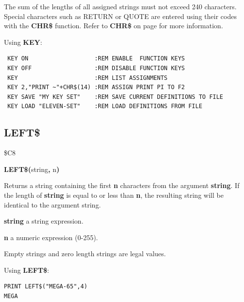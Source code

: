 \begin{description}[leftmargin=2cm,style=nextline]
\item [Remarks:] The sum of the lengths of all assigned strings
                 must not exceed 240 characters.
                 Special characters such as RETURN or QUOTE are entered
                 using their codes with the {\bf CHR\$} function.
                 Refer to {\bf CHR\$} on page \pageref{chrcommand}
                 for more information.

\item [Examples:] Using {\bf KEY}:
\begin{tcolorbox}[colback=black,coltext=white]
\verbatimfont{\codefont}
\begin{verbatim}
 KEY ON                   :REM ENABLE  FUNCTION KEYS
 KEY OFF                  :REM DISABLE FUNCTION KEYS
 KEY                      :REM LIST ASSIGNMENTS
 KEY 2,"PRINT ~"+CHR$(14) :REM ASSIGN PRINT PI TO F2
 KEY SAVE "MY KEY SET"    :REM SAVE CURRENT DEFINITIONS TO FILE
 KEY LOAD "ELEVEN-SET"    :REM LOAD DEFINITIONS FROM FILE
\end{verbatim}
\end{tcolorbox}
\end{description}


\newpage
\subsection{LEFT\$}
\begin{description}[leftmargin=2cm,style=nextline]
\item [Token:] \$C8
\item [Format:] {\bf LEFT\$(}string{\bf,} n{\bf)}
\item [Usage:] Returns a string
               containing the first {\bf n} characters from the
               argument {\bf string}.
               If the length of {\bf string} is equal to or less than {\bf n},
               the resulting string will be identical to the argument string.

               {\bf string} a string expression.

               {\bf n} a numeric expression (0-255).

\item [Remarks:] Empty strings and zero length strings are legal values.

\item [Example:] Using {\bf LEFT\$}:
\begin{tcolorbox}[colback=black,coltext=white]
\verbatimfont{\codefont}
\begin{verbatim}
PRINT LEFT$("MEGA-65",4)
MEGA
\end{verbatim}
\end{tcolorbox}
\end{description}

